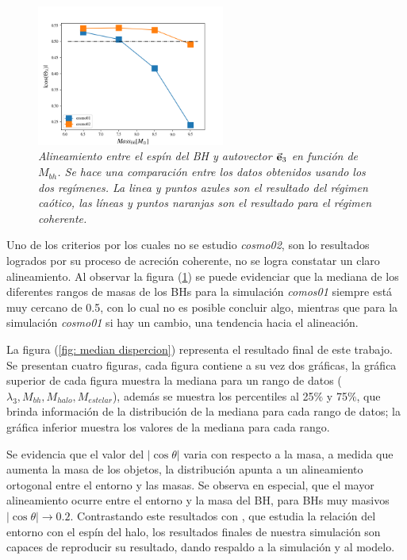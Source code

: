 \begin{figure}
    \centering
    \includegraphics[width=0.55\textwidth]{./figures/6_Resultados/cosmo01/percentiles/relacion_simulaciones_Mass_bh}
    \caption{\emph{Alineamiento entre el espín del BH y autovector $\vec{\bf{e}}_3$ en función de $M_{bh}$. Se hace una comparación entre los datos obtenidos usando los dos regímenes. La linea y puntos azules son el resultado del régimen caótico, las líneas y puntos naranjas son el resultado para el régimen coherente.}}
    \label{fig: comparacion cosmo01 y cosmo02}
\end{figure}
 
Uno de los criterios por los cuales no se estudio {\it{cosmo02}}, son lo resultados logrados por su proceso de acreción coherente, no se logra constatar un claro  alineamiento. Al observar la figura (\ref{fig: comparacion cosmo01 y cosmo02}) se puede evidenciar que la mediana de los diferentes rangos de masas de los BHs para la simulación {\it{comos01}} siempre está muy cercano de 0.5, con lo cual no es posible concluir algo, mientras que para la simulación {\it{cosmo01}} si hay un cambio, una tendencia hacia el alineación. 

La figura (\ref{fig: median dispercion}) representa el resultado final de este trabajo. Se presentan cuatro  figuras, cada figura contiene a su vez dos gráficas, la gráfica superior de cada figura muestra la mediana para un rango de datos ($\lambda_{3}, M_{bh}, M_{halo}, M_{estelar}$), además se muestra los percentiles al 25$\%$ y 75$\%$, que brinda información de la distribución de la mediana para cada rango de datos; la gráfica inferior muestra los valores de la  mediana para cada rango.

Se evidencia que el valor del $|\cos \theta|$ varia con respecto a la masa, a medida que aumenta la masa de los objetos, la distribución apunta a un alineamiento ortogonal entre el entorno y las masas. Se observa en especial, que el mayor alineamiento ocurre entre el entorno y la masa del BH, para BHs muy masivos $|\cos\theta| \to 0.2$. Contrastando este resultados con \cite{wang2018}, que estudia la relación del entorno con el espín del halo, los resultados finales de nuestra simulación son capaces de reproducir su resultado, dando  respaldo a la simulación y al modelo.

